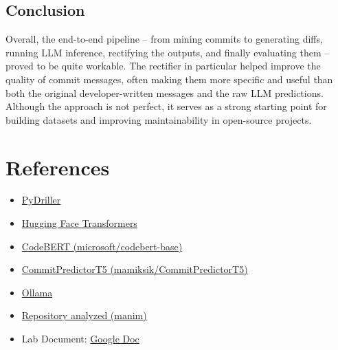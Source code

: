 \documentclass[10pt,a4paper]{report}
\begin{document}
\subsection{Conclusion}
Overall, the end-to-end pipeline -- from mining commits to generating diffs, running LLM inference, rectifying the outputs, and finally evaluating them -- proved to be quite workable. The rectifier in particular helped improve the quality of commit messages, often making them more specific and useful than both the original developer-written messages and the raw LLM predictions. Although the approach is not perfect, it serves as a strong starting point for building datasets and improving maintainability in open-source projects.

\section{References}
\begin{itemize}[itemsep=0.05em, topsep=0pt]
    \item \href{https://pydriller.readthedocs.io}{PyDriller}
    \item \href{https://huggingface.co/docs/transformers}{Hugging Face Transformers}
    \item \href{https://huggingface.co/microsoft/codebert-base}{CodeBERT (microsoft/codebert-base)}
    \item \href{https://huggingface.co/mamiksik/CommitPredictorT5}{CommitPredictorT5 (mamiksik/CommitPredictorT5)}
    \item \href{https://ollama.ai}{Ollama}
    \item \href{https://github.com/3b1b/manim}{Repository analyzed (manim)}
    \item Lab Document: \href{https://drive.google.com/file/d/1L4pCGQCekeELjgOJ4HxQ-Tso0QaOKIDf/view}{Google Doc}
\end{itemize}
\end{document}
